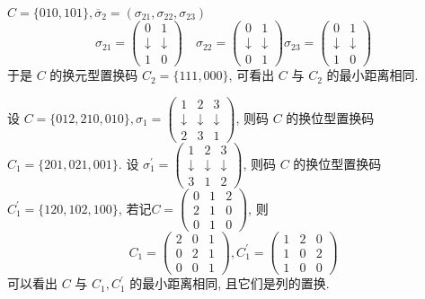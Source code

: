 \begin{example}
$ C=\{010,101\}, \overline{\sigma}_{2}=\left(\sigma_{21}, \sigma_{22}, \sigma_{23}\right) $
$$
\sigma_{21}=\left(\begin{array}{cc}
0 & 1 \\
\downarrow & \downarrow \\
1 & 0
\end{array}\right) \quad \sigma_{22}=\left(\begin{array}{ll}
0 & 1 \\
\downarrow & \downarrow \\
0 & 1
\end{array}\right) \sigma_{23}=\left(\begin{array}{cc}
0 & 1 \\
\downarrow & \downarrow \\
1 & 0
\end{array}\right)
$$
于是 $ C $ 的换元型置换码 $ C_{2}=\{111,000\} $, 可看出 $ C $ 与 $ C_{2} $ 的最小距离相同.
\end{example}

\begin{example}
设 $ C=\{012,210,010\}, \sigma_{1}=\left(\begin{array}{lll}1 & 2 & 3 \\ \downarrow & \downarrow & \downarrow \\ 2 & 3 & 1\end{array}\right) $, 则码 $ C $ 的换位型置换码 $ C_{1}=\{201,021,001\} $. 设 $ \sigma_{1}^{\prime}=\left(\begin{array}{lll}1 & 2 & 3 \\ \downarrow & \downarrow & \downarrow \\ 3 & 1 & 2\end{array}\right) $, 则码 $ C $ 的换位型置换码 $ C_{1}^{\prime}=\{120,102,100\} $, 若记$C=\left(\begin{array}{lll}
0 & 1 & 2 \\
2 & 1 & 0 \\
0 & 1 & 0
\end{array}\right) $, 则
$$
 C_{1}=\left(\begin{array}{lll}
2 & 0 & 1 \\
0 & 2 & 1 \\
0 & 0 & 1
\end{array}\right), C_{1}^{\prime}=\left(\begin{array}{lll}
1 & 2 & 0 \\
1 & 0 & 2 \\
1 & 0 & 0
\end{array}\right)
$$
可以看出 $ C $ 与 $ C_{1}, C_{1}^{\prime} $ 的最小距离相同, 且它们是列的置换.
\end{example}

